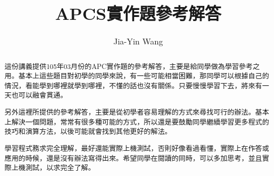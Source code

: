 \documentclass[12pt,a4paper]{article}
\begin{document}
\title{APCS實作題參考解答}
\author{Jia-Yin Wang}
\maketitle

\begin{abstract}
這份講義提供105年03月份的APC實作題的參考解答，主要是給同學做為學習參考之用。基本上這些題目對初學的同學來說，有一些可能相當困難，那同學可以根據自己的情況，看能學到哪裡就學到哪裡，不懂的話也沒有關係。只要慢慢學習下去，將來有一天也可以融會貫通。

另外這裡所提供的參考解答，主要是從初學者容易理解的方式來尋找可行的辦法。基本上解決一個問題，常常有很多種可能的方式，所以還是要鼓勵同學繼續學習更多程式的技巧和演算方法，以後可能就會找到其他更好的解法。

學習程式務求完全理解，最好還能實際上機測試，否則好像看過看懂，實際上在作答或應用的時候，還是沒有辦法寫得出來。希望同學在閱讀的同時，可以多加思考，並且實際上機測試，以求完全了解。
\end{abstract}

\newpage

\newpage

\newpage

\end{document}
